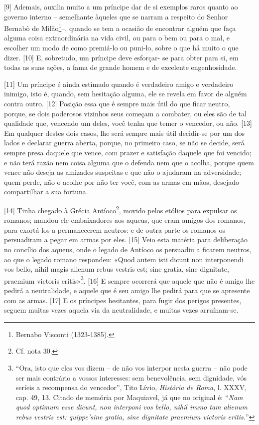 {[}9{]} Ademais, auxilia muito a um príncipe dar de si exemplos raros
quanto ao governo interno -- semelhante àqueles que se narram a respeito
do Senhor Bernabò de Milão\footnote{Bernabo Visconti (1323-1385).}--,
quando se tem a ocasião de encontrar alguém que faça alguma coisa
extraordinária na vida civil, ou para o bem ou para o mal, e escolher um
modo de como premiá-lo ou puni-lo, sobre o que há muito o que dizer.
{[}10{]} E, sobretudo, um príncipe deve esforçar- se para obter para si,
em todas as suas ações, a fama de grande homem e de excelente
engenhosidade.

{[}11{]} Um príncipe é ainda estimado quando é verdadeiro amigo e
verdadeiro inimigo, isto é, quando, sem hesitação alguma, ele se revela
em favor de alguém contra outro. {[}12{]} Posição essa que é sempre mais
útil do que ficar neutro, porque, se dois poderosos vizinhos seus
começam a combater, ou eles são de tal qualidade que, vencendo um deles,
você tenha que temer o vencedor, ou não. {[}13{]} Em qualquer destes
dois casos, lhe será sempre mais útil decidir-se por um dos lados e
declarar guerra aberta, porque, no primeiro caso, se não se decide, será
sempre presa daquele que vence, com prazer e satisfação daquele que foi
vencido; e não terá razão nem coisa alguma que o defenda nem que o
acolha, porque quem vence não deseja as amizades suspeitas e que não o
ajudaram na adversidade; quem perde, não o acolhe por não ter você, com
as armas em mãos, desejado compartilhar a sua fortuna.

{[}14{]} Tinha chegado à Grécia Antíoco\footnote{Cf. nota 30.}, movido
pelos etólios para expulsar os romanos; mandou ele embaixadores aos
aqueus, que eram amigos dos romanos, para exortá-los a permanecerem
neutros: e de outra parte os romanos os persuadiram a pegar em armas por
eles. {[}15{]} Veio esta matéria para deliberação no concílio dos
aqueus, onde o legado de Antíoco os persuadiu a ficarem neutros, ao que
o legado romano respondeu: «Quod autem isti dicunt non interponendi vos
bello, nihil magis alienum rebus vestris est; sine gratia, sine
dignitate, praemium victoris eritis»\footnote{``Ora, isto que eles vos
  dizem -- de não vos interpor nesta guerra -- não pode ser mais
  contrário a vossos interesses: sem benevolência, sem dignidade, vós
  seríeis a recompensa do vencedor'', Tito Lívio, \emph{História de
  Roma}, l. XXXV, cap. 49, 13. Citado de memória por Maquiavel, já que
  no original é: ``\emph{Nam quod optimum esse dicunt, non interponi vos
  bello, nihil immo tam alienum rebus vestris est: quippe'sine gratia,
  sine dignitate praemium victoris eritis.}''}. {[}16{]} E sempre
ocorrerá que aquele que não é amigo lhe pedirá a neutralidade, e aquele
que é seu amigo lhe pedirá para que se apresente com as armas. {[}17{]}
E os príncipes hesitantes, para fugir dos perigos presentes, seguem
muitas vezes aquela via da neutralidade, e muitas vezes arruínam-se.

